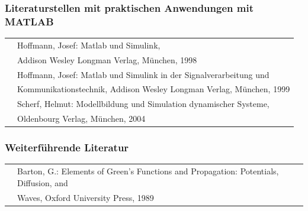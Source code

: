 \subsubsection{Literaturstellen mit praktischen Anwendungen mit MATLAB}

\begin{tabular}{|p{0.6in}|p{5.7in}|} \hline 
[Hoff98] & Hoffmann, Josef: Matlab und Simulink, \\
& Addison Wesley Longman Verlag, München, 1998\\ \hline 
[Hoff99] & Hoffmann, Josef: Matlab und Simulink in der Signalverarbeitung und \\
& Kommunikationstechnik, Addison Wesley Longman Verlag, München, 1999\\ \hline 
[Sche04] & Scherf, Helmut: Modellbildung und Simulation dynamischer Systeme,\\
& Oldenbourg Verlag, München, 2004\\ \hline 
\end{tabular}


\subsubsection{Weiterführende Literatur}

\begin{tabular}{|p{0.6in}|p{5.7in}|} \hline 
[Bart89] & Barton, G.: Elements of Green's Functions and Propagation: Potentials, Diffusion, and\\
&   Waves, Oxford University Press, 1989\\ \hline 
\end{tabular}